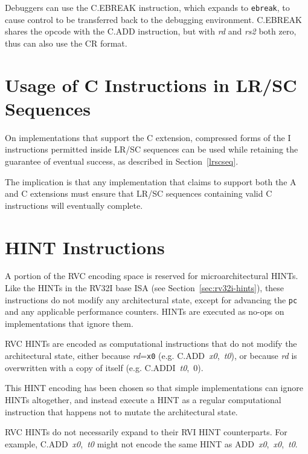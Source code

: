 Debuggers can use the C.EBREAK instruction, which expands to {\tt ebreak},
to cause control to be transferred back to the debugging environment.
C.EBREAK shares the opcode with the C.ADD instruction, but with {\em
  rd} and {\em rs2} both zero, thus can also use the CR format.

\section{Usage of C Instructions in LR/SC Sequences}

On implementations that support the C extension, compressed forms of
the I instructions permitted inside LR/SC sequences can be used while
retaining the guarantee of eventual success, as described in
Section~\ref{lrscseq}.

\begin{commentary}
The implication is that any implementation that claims to support both
the A and C extensions must ensure that LR/SC sequences containing
valid C instructions will eventually complete.
\end{commentary}

\section{HINT Instructions}
\label{sec:rvc-hints}

A portion of the RVC encoding space is reserved for microarchitectural HINTs.
Like the HINTs in the RV32I base ISA (see Section~\ref{sec:rv32i-hints}),
these instructions do not modify any architectural state, except for advancing
the {\tt pc} and any applicable performance counters.  HINTs are
executed as no-ops on implementations that ignore them.

RVC HINTs are encoded as computational instructions that do not modify the
architectural state, either because {\em rd}={\tt x0}
(e.g. \mbox{C.ADD {\em x0}, {\em t0}}), or because {\em rd} is overwritten
with a copy of itself (e.g. \mbox{C.ADDI {\em t0}, 0}).

\begin{commentary}
This HINT encoding has been chosen so that simple implementations can ignore
HINTs altogether, and instead execute a HINT as a regular computational
instruction that happens not to mutate the architectural state.
\end{commentary}

RVC HINTs do not necessarily expand to their RVI HINT counterparts.  For
example, \mbox{C.ADD {\em x0}, {\em t0}} might not encode the same HINT
as \mbox{ADD {\em x0}, {\em x0}, {\em t0}}.

